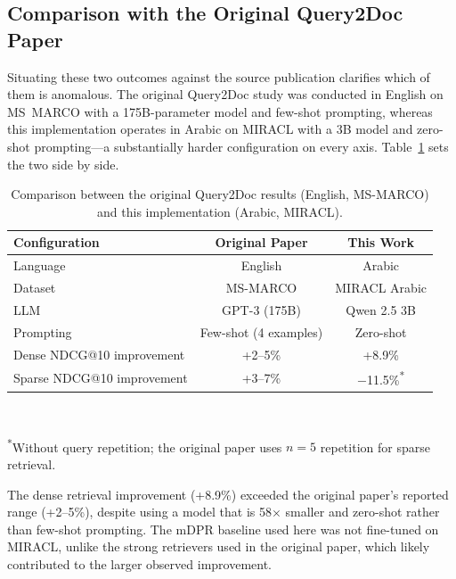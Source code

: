 \subsection{Comparison with the Original Query2Doc Paper}
\label{sec:res_q2d_comparison}

Situating these two outcomes against the source publication clarifies which of them is anomalous. The original Query2Doc study \cite{wang_2023_query2doc} was conducted in English on MS~MARCO with a 175B-parameter model and few-shot prompting, whereas this implementation operates in Arabic on MIRACL with a 3B model and zero-shot prompting---a substantially harder configuration on every axis. Table~\ref{tab:q2d_paper_comparison} sets the two side by side.

\begin{table}[htbp]
    \centering
    \caption[Query2Doc: original paper versus this implementation]{Comparison between the original Query2Doc results (English, MS-MARCO) and this implementation (Arabic, MIRACL).}
    \label{tab:q2d_paper_comparison}
    \begin{tabular}{@{}lcc@{}}
        \toprule
        \textbf{Configuration} & \textbf{Original Paper} & \textbf{This Work} \\
        \midrule
        Language & English & Arabic \\
        Dataset & MS-MARCO & MIRACL Arabic \\
        LLM & GPT-3 (175B) & Qwen 2.5 3B \\
        Prompting & Few-shot (4 examples) & Zero-shot \\
        Dense NDCG@10 improvement & +2--5\% & +8.9\% \\
        Sparse NDCG@10 improvement & +3--7\% & $-$11.5\%\textsuperscript{*} \\
        \bottomrule
    \end{tabular}
    \\[0.5em]
    \raggedright\small\textsuperscript{*}Without query repetition; the original paper uses $n=5$ repetition for sparse retrieval.
\end{table}

The dense retrieval improvement (+8.9\%) exceeded the original paper's reported range (+2--5\%), despite using a model that is 58$\times$ smaller and zero-shot rather than few-shot prompting. The mDPR baseline used here was not fine-tuned on MIRACL, unlike the strong retrievers used in the original paper, which likely contributed to the larger observed improvement.


